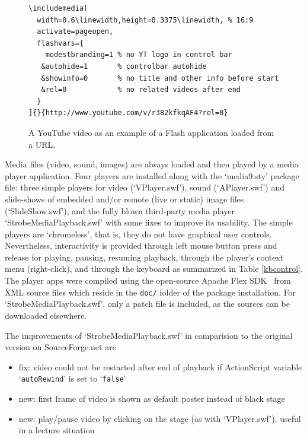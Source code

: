 \documentclass[a4paper]{article}
\begin{document}
\begin{figure}[H]
\centering
\begin{Verbatim}
\includemedia[
  width=0.6\linewidth,height=0.3375\linewidth, % 16:9
  activate=pageopen,
  flashvars={
    modestbranding=1 % no YT logo in control bar
   &autohide=1       % controlbar autohide
   &showinfo=0       % no title and other info before start
   &rel=0            % no related videos after end
  }
]{}{http://www.youtube.com/v/r382kfkqAF4?rel=0}
\end{Verbatim}
\vspace{1ex}
\caption{A YouTube video as an example of a Flash application loaded from a URL.}\label{alien}
\end{figure}

Media files (video, sound, images) are always loaded and then played by a media player application. Four players are installed along with the `media9.sty' package file: three simple players for video (`VPlayer.swf'), sound (`APlayer.swf') and slide-shows of embedded and/or remote (live or static) image files (`SlideShow.swf'), and the fully blown third-party media player `StrobeMediaPlayback.swf' with some fixes to improve its usability. The simple players are `chromeless', that is, they do not have graphical user controls. Nevertheless, interactivity is provided through left mouse button press and release for playing, pausing, resuming playback, through the player's context menu (right-click), and through the keyboard as summarized in Table \ref{kbcontrol}. The player apps were compiled using the open-source Apache Flex SDK~\cite{flex} from XML source files which reside in the \verb+doc/+ folder of the package installation. For `StrobeMediaPlayback.swf', only a patch file is included, as the sources can be downloaded elsewhere.

The improvements of `StrobeMediaPlayback.swf' in comparision to the original version on SourceForge.net are
\begin{itemize}
  \item fix: video could not be restarted after end of playback if ActionScript variable `{\tt autoRewind}' is set to `{\tt false}'
  \item new: first frame of video is shown as default poster instead of black stage
  \item new: play/pause video by clicking on the stage (as with `VPlayer.swf'), useful in a lecture situation
\end{itemize}
\end{document}

